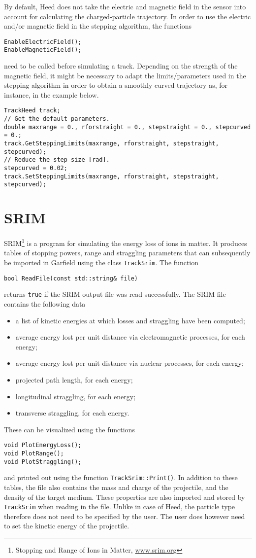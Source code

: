 By default, Heed does not take the electric and magnetic field in the sensor into account for 
calculating the charged-particle trajectory. In order to use the electric and/or magnetic field  
in the stepping algorithm, the functions 
\begin{lstlisting}
EnableElectricField();
EnableMagneticField();
\end{lstlisting}
need to be called before simulating a track.
Depending on the strength of the magnetic field, it might be necessary to adapt the 
limits/parameters used in the stepping algorithm in order to obtain a smoothly curved 
trajectory as, for instance, in the example below.
\begin{lstlisting}
TrackHeed track;
// Get the default parameters.
double maxrange = 0., rforstraight = 0., stepstraight = 0., stepcurved = 0.;
track.GetSteppingLimits(maxrange, rforstraight, stepstraight, stepcurved);
// Reduce the step size [rad]. 
stepcurved = 0.02;
track.SetSteppingLimits(maxrange, rforstraight, stepstraight, stepcurved);
\end{lstlisting} 

\section{SRIM}
SRIM\footnote{Stopping and Range of Ions in Matter, \href{www.srim.org}{www.srim.org}} is a program for simulating the energy loss of ions in matter. 
It produces tables of stopping powers, range and straggling parameters that 
can subsequently be imported in Garfield using the class \texttt{TrackSrim}. 
The function
\begin{lstlisting}
bool ReadFile(const std::string& file)
\end{lstlisting}
returns \texttt{true} if the SRIM output file was read successfully.
The SRIM file contains the following data
\begin{itemize}
\item
a list of kinetic energies at which losses and straggling have been computed;
\item
average energy lost per unit distance via electromagnetic processes, for each energy;
\item
average energy lost per unit distance via nuclear processes, for each energy;
\item
projected path length, for each energy;
\item
longitudinal straggling, for each energy;
\item
transverse straggling, for each energy.
\end{itemize}
These can be visualized using the functions
\begin{lstlisting}
void PlotEnergyLoss();
void PlotRange();
void PlotStraggling();
\end{lstlisting}
and printed out using the function \texttt{TrackSrim::Print()}.
In addition to these tables, the file also contains the mass and charge of 
the projectile, and the density of the target medium.
These properties are also imported and stored by \texttt{TrackSrim} 
when reading in the file. Unlike in case of Heed, the particle type 
therefore does not need to be specified by the user. 
The user does however need to set the kinetic energy of the projectile.


